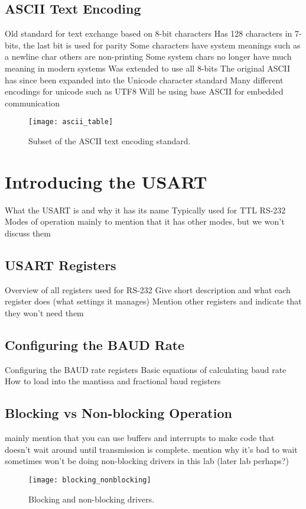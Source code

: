 \documentclass[11pt,fleqn]{book} %
\begin{document}
\subsection{ASCII Text Encoding}
Old standard for text exchange based on 8-bit characters
Has 128 characters in 7-bits, the last bit is used for parity
Some characters have system meanings such as a newline char
others are non-printing
Some system chars no longer have much meaning in modern systems
Was extended to use all 8-bits 
The original ASCII has since been expanded into the Unicode character standard
Many different encodings for unicode such as UTF8
Will be using base ASCII for embedded communication	
\begin{figure}[]
    \centering\texttt{[image: ascii\_table]}
    \caption{Subset of the ASCII text encoding standard.}
    \label{ascii_table}
\end{figure}

\section{Introducing the USART}
What the USART is and why it has its name
Typically used for TTL RS-232
Modes of operation
mainly to mention that it has other modes, but we won't discuss them 
\subsection{USART Registers}	
Overview of all registers used for RS-232
Give short description and what each register does (what settings it manages)
Mention other registers and indicate that they won't need them
\subsection{Configuring the BAUD Rate}	
Configuring the BAUD rate registers
Basic equations of calculating baud rate
How to load into the mantissa and fractional baud registers
\subsection{Blocking vs Non-blocking Operation}
mainly mention that you can use buffers and interrupts to make code that doesn't wait around until transmission is complete. 
mention why it's bad to wait sometimes
won't be doing non-blocking drivers in this lab (later lab perhaps?)
\begin{figure}[]
    \centering\texttt{[image: blocking\_nonblocking]}
    \caption{Blocking and non-blocking drivers.}
    \label{blocking_nonblocking}
\end{figure}
\end{document}
